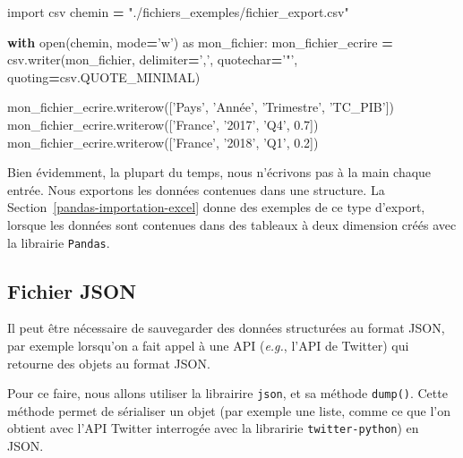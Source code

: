 \documentclass[12pt,]{book}
\newenvironment{Shaded}{\begin{snugshade}}{\end{snugshade}}
\newcommand{\FloatTok}[1]{\textcolor[rgb]{0.00,0.00,0.81}{#1}}
\newcommand{\StringTok}[1]{\textcolor[rgb]{0.31,0.60,0.02}{#1}}
\newcommand{\ImportTok}[1]{#1}
\newcommand{\ControlFlowTok}[1]{\textcolor[rgb]{0.13,0.29,0.53}{\textbf{#1}}}
\newcommand{\OperatorTok}[1]{\textcolor[rgb]{0.81,0.36,0.00}{\textbf{#1}}}
\newcommand{\BuiltInTok}[1]{#1}
\newcommand{\NormalTok}[1]{#1}
\numberwithin{equation}{section}
\numberwithin{countremarque}{section}
\begin{document}
\begin{Shaded}
\begin{Highlighting}[]
\ImportTok{import}\NormalTok{ csv}
\NormalTok{chemin }\OperatorTok{=} \StringTok{"./fichiers_exemples/fichier_export.csv"}

\ControlFlowTok{with} \BuiltInTok{open}\NormalTok{(chemin, mode}\OperatorTok{=}\StringTok{'w'}\NormalTok{) }\ImportTok{as}\NormalTok{ mon_fichier:}
\NormalTok{    mon_fichier_ecrire }\OperatorTok{=}\NormalTok{ csv.writer(mon_fichier, delimiter}\OperatorTok{=}\StringTok{','}\NormalTok{,}
\NormalTok{                                    quotechar}\OperatorTok{=}\StringTok{'"'}\NormalTok{,}
\NormalTok{                                    quoting}\OperatorTok{=}\NormalTok{csv.QUOTE_MINIMAL)}

\NormalTok{    mon_fichier_ecrire.writerow([}\StringTok{'Pays'}\NormalTok{, }\StringTok{'Année'}\NormalTok{, }\StringTok{'Trimestre'}\NormalTok{, }\StringTok{'TC_PIB'}\NormalTok{])}
\NormalTok{    mon_fichier_ecrire.writerow([}\StringTok{'France'}\NormalTok{, }\StringTok{'2017'}\NormalTok{, }\StringTok{'Q4'}\NormalTok{, }\FloatTok{0.7}\NormalTok{])}
\NormalTok{    mon_fichier_ecrire.writerow([}\StringTok{'France'}\NormalTok{, }\StringTok{'2018'}\NormalTok{, }\StringTok{'Q1'}\NormalTok{, }\FloatTok{0.2}\NormalTok{])}
\end{Highlighting}
\end{Shaded}

Bien évidemment, la plupart du temps, nous n'écrivons pas à la main
chaque entrée. Nous exportons les données contenues dans une structure.
La Section~\ref{pandas-importation-excel} donne des exemples de ce type
d'export, lorsque les données sont contenues dans des tableaux à deux
dimension créés avec la librairie \texttt{Pandas}.

\subsection{Fichier JSON}\label{fichier-json-1}

Il peut être nécessaire de sauvegarder des données structurées au format
JSON, par exemple lorsqu'on a fait appel à une API (\emph{e.g.}, l'API
de Twitter) qui retourne des objets au format JSON.

Pour ce faire, nous allons utiliser la librairire \texttt{json}, et sa
méthode \texttt{dump()}. Cette méthode permet de sérialiser un objet
(par exemple une liste, comme ce que l'on obtient avec l'API Twitter
interrogée avec la libraririe \texttt{twitter-python}) en JSON.
\end{document}
